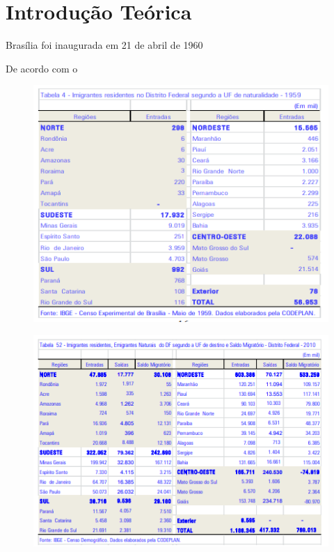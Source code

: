 \chapter{Introdução Teórica}

Brasília foi inaugurada em 21 de abril de 1960

De acordo com o 
\begin{figure}
    \centering
    \includegraphics[width=0.7\linewidth]{fig/imigrantes-1959}
    \caption{}
    \label{fig:imigrantes-1959}
\end{figure}

\begin{figure}
    \centering
    \includegraphics[width=0.7\linewidth]{fig/imigrantes-2010}
    \caption{}
    \label{fig:imigrantes-2010}
\end{figure}
